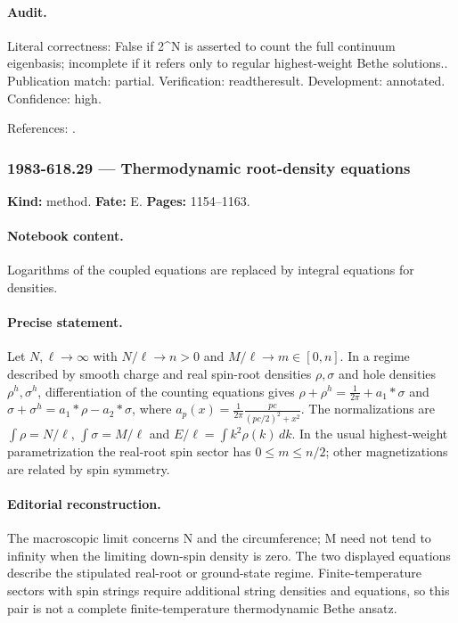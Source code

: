 \paragraph{Audit.} Literal correctness: False if 2\textasciicircum{}N is asserted to count the full continuum eigenbasis; incomplete if it refers only to regular highest-weight Bethe solutions.. Publication match: partial. Verification: readtheresult. Development: annotated. Confidence: high.

\noindent References: \citep{yang1967manybody,faddeev1996bethe}.\par

\subsubsection{1983-618.29 --- Thermodynamic root-density equations}

\label{item:1983-618.29}

\noindent\textbf{Kind:} method. \textbf{Fate:} E. \textbf{Pages:} 1154--1163.\par

\paragraph{Notebook content.} Logarithms of the coupled equations are replaced by integral equations for densities.

\paragraph{Precise statement.} Let $N,\ell\to\infty$ with $N/\ell\to n>0$ and $M/\ell\to m\in[0,n]$. In a regime described by smooth charge and real spin-root densities $\rho,\sigma$ and hole densities $\rho^h,\sigma^h$, differentiation of the counting equations gives $\rho+\rho^h=\frac1{2\pi}+a_1*\sigma$ and $\sigma+\sigma^h=a_1*\rho-a_2*\sigma$, where $a_p(x)=\frac1{2\pi}\frac{pc}{(pc/2)^2+x^2}$. The normalizations are $\int\rho=N/\ell$, $\int\sigma=M/\ell$ and $E/\ell=\int k^2\rho(k)\,dk$. In the usual highest-weight parametrization the real-root spin sector has $0\leq m\leq n/2$; other magnetizations are related by spin symmetry.

\paragraph{Editorial reconstruction.} The macroscopic limit concerns N and the circumference; M need not tend to infinity when the limiting down-spin density is zero. The two displayed equations describe the stipulated real-root or ground-state regime. Finite-temperature sectors with spin strings require additional string densities and equations, so this pair is not a complete finite-temperature thermodynamic Bethe ansatz.


